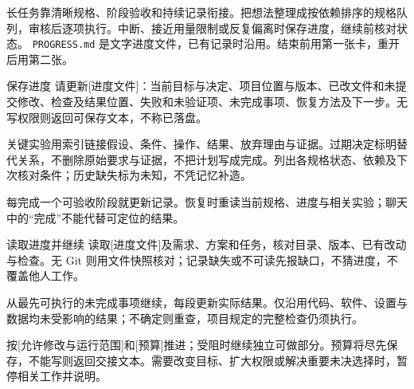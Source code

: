 长任务靠清晰规格、阶段验收和持续记录衔接。把想法整理成按依赖排序的规格队列，审核后逐项执行。中断、接近用量限制或反复偏离时保存进度，继续前核对状态。
\texttt{PROGRESS.md} 是文字进度文件，已有记录时沿用。结束前用第一张卡，重开后用第二张。
\begin{prompt}{保存进度}
请更新[进度文件]：当前目标与决定、项目位置与版本、已改文件和未提交修改、检查及结果位置、失败和未验证项、未完成事项、恢复方法及下一步。无写权限则返回可保存文本，不称已落盘。\par
关键实验用索引链接假设、条件、操作、结果、放弃理由与证据。过期决定标明替代关系，不删除原始要求与证据，不把计划写成完成。列出各规格状态、依赖及下次核对条件；历史缺失标为未知，不凭记忆补造。
\end{prompt}
每完成一个可验收阶段就更新记录。恢复时重读当前规格、进度与相关实验；聊天中的“完成”不能代替可定位的结果。
\begin{prompt}{读取进度并继续}
读取[进度文件]及需求、方案和任务，核对目录、版本、已有改动与检查。无 Git 则用文件快照核对；记录缺失或不可读先报缺口，不猜进度，不覆盖他人工作。\par
从最先可执行的未完成事项继续，每段更新实际结果。仅沿用代码、软件、设置与数据均未受影响的结果；不确定则重查，项目规定的完整检查仍须执行。\par
按[允许修改与运行范围]和[预算]推进；受阻时继续独立可做部分。预算将尽先保存，不能写则返回交接文本。需要改变目标、扩大权限或解决重要未决选择时，暂停相关工作并说明。
\end{prompt}
